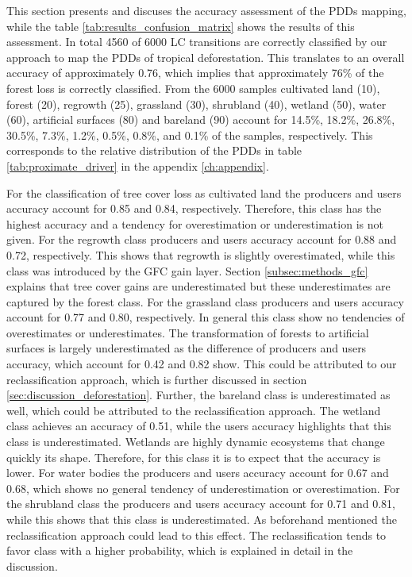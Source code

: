 			This section presents and discuses the accuracy assessment of the \acp{PDD} mapping, while the table \ref{tab:results_confusion_matrix} shows the results of this assessment. In total 4560 of 6000 \ac{LC} transitions are correctly classified by our approach to map the \acp{PDD} of tropical deforestation. This translates to an overall accuracy of approximately 0.76, which implies that approximately 76\% of the forest loss is correctly classified. From the 6000 samples cultivated land (10), forest (20), regrowth (25), grassland (30), shrubland (40), wetland (50), water (60), artificial surfaces (80) and bareland (90) account for 14.5\%, 18.2\%, 26.8\%, 30.5\%, 7.3\%, 1.2\%, 0.5\%, 0.8\%, and 0.1\% of the samples, respectively. This corresponds to the relative distribution of the  \acp{PDD} in table \ref{tab:proximate_driver} in the appendix \ref{ch:appendix}. 

			For the classification of tree cover loss as cultivated land the producers and users accuracy account for 0.85 and 0.84, respectively. Therefore, this class has the highest accuracy and a tendency for overestimation or underestimation is not given. For the regrowth class producers and users accuracy account for 0.88 and 0.72, respectively. This shows that regrowth is slightly overestimated, while this class was introduced by the \ac{GFC} gain layer. Section \ref{subsec:methods_gfc} explains that tree cover gains are underestimated but these underestimates are captured by the forest class. For the grassland class producers and users accuracy account for 0.77 and 0.80, respectively. In general this class show no tendencies of overestimates or underestimates. The transformation of forests to artificial surfaces is largely underestimated as the difference of producers and users accuracy, which account for 0.42 and 0.82 show. This could be attributed to our reclassification approach, which is further discussed in section \ref{sec:discussion_deforestation}. Further, the bareland class is underestimated as well, which could be attributed to the reclassification approach. The wetland class achieves an accuracy of 0.51, while the users accuracy highlights that this class is underestimated. Wetlands are highly dynamic ecosystems that change quickly its shape. Therefore, for this class it is to expect that the accuracy is lower. For water bodies the producers and users accuracy account for 0.67 and 0.68, which shows no general tendency of underestimation or overestimation. For the shrubland class the producers and users accuracy account for 0.71 and 0.81, while this shows that this class is underestimated. As beforehand mentioned the reclassification approach could lead to this effect. The reclassification tends to favor class with a higher probability, which is explained in detail in the discussion.

